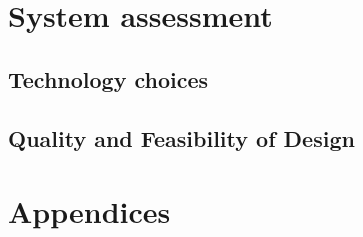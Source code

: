 \documentclass{article}
\begin{document}
		\newpage

		\section{System assessment}\label{sec:assessment }	
			\subsection{Technology choices}\label{subsec:tech choices}
			\subsection{Quality and Feasibility of Design}\label{subsec:quality}

	 \cleardoublepage
	 \section{Appendices}\label{sec:appendices}
 		
	
\end{document}
